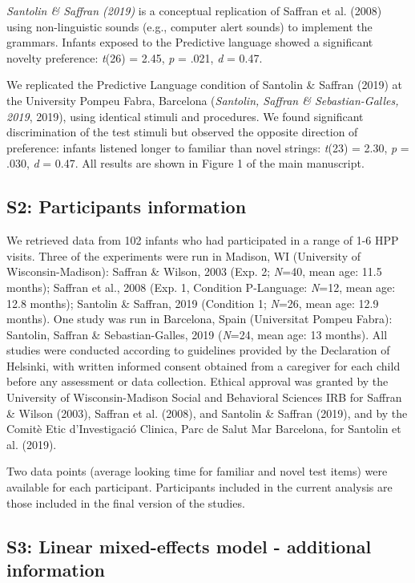 \documentclass[
  english,
  man,man,floatsintext]{apa6}
\begin{document}
\begin{appendix}
\emph{Santolin \& Saffran (2019)} is a conceptual replication of Saffran
et al. (2008) using non-linguistic sounds (e.g., computer alert sounds)
to implement the grammars. Infants exposed to the Predictive language
showed a significant novelty preference: \emph{t}(26) = 2.45, \emph{p} =
.021, \emph{d} = 0.47.

We replicated the Predictive Language condition of Santolin \& Saffran
(2019) at the University Pompeu Fabra, Barcelona (\emph{Santolin,
Saffran \& Sebastian-Galles, 2019}, 2019), using identical stimuli and
procedures. We found significant discrimination of the test stimuli but
observed the opposite direction of preference: infants listened longer
to familiar than novel strings: \emph{t}(23) = 2.30, \emph{p} = .030,
\emph{d} = 0.47. All results are shown in Figure 1 of the main
manuscript.

\hypertarget{s2}{%
\subsection{S2: Participants information}\label{s2}}

We retrieved data from 102 infants who had participated in a range of
1-6 HPP visits. Three of the experiments were run in Madison, WI
(University of Wisconsin-Madison): Saffran \& Wilson, 2003 (Exp. 2;
\emph{N}=40, mean age: 11.5 months); Saffran et al., 2008 (Exp. 1,
Condition P-Language: \emph{N}=12, mean age: 12.8 months); Santolin \&
Saffran, 2019 (Condition 1; \emph{N}=26, mean age: 12.9 months). One
study was run in Barcelona, Spain (Universitat Pompeu Fabra): Santolin,
Saffran \& Sebastian-Galles, 2019 (\emph{N}=24, mean age: 13 months).
All studies were conducted according to guidelines provided by the
Declaration of Helsinki, with written informed consent obtained from a
caregiver for each child before any assessment or data collection.
Ethical approval was granted by the University of Wisconsin-Madison
Social and Behavioral Sciences IRB for Saffran \& Wilson (2003), Saffran
et al. (2008), and Santolin \& Saffran (2019), and by the Comitè Etic
d'Investigació Clinica, Parc de Salut Mar Barcelona, for Santolin et al.
(2019).

Two data points (average looking time for familiar and novel test items)
were available for each participant. Participants included in the
current analysis are those included in the final version of the studies.

\hypertarget{s3}{%
\subsection{S3: Linear mixed-effects model - additional
information}\label{s3}}


\end{appendix}
\end{document}
